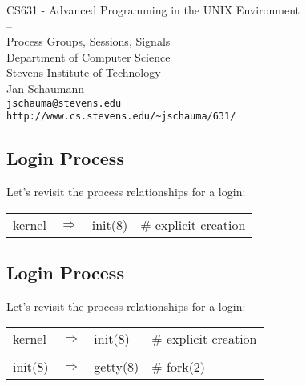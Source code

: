\documentclass[xga]{xdvislides}
\begin{document}
\setfontphv

\lhead{\slidetitle}
\cfoot{\relax}
\rfoot{\Gray{\today}}

\vspace*{\fill}
\begin{center}
	\Hugesize
		CS631 - Advanced Programming in the UNIX Environment\\
		-- \\
		Process Groups, Sessions, Signals
	\hspace*{5mm}\blueline\\ [1em]
	\Normalsize
		Department of Computer Science\\
		Stevens Institute of Technology\\
		Jan Schaumann\\
		\verb+jschauma@stevens.edu+\\
		\verb+http://www.cs.stevens.edu/~jschauma/631/+
\end{center}
\vspace*{\fill}
\subsection{Login Process}
Let's revisit the process relationships for a login:
\vspace*{\fill}
\begin{center}
\begin{tabular}[width=.75\texwidth]{l c l l}
kernel & $\Rightarrow$ & init(8) & \# explicit creation\\
\end{tabular}
\end{center}
\vspace*{\fill}

\subsection{Login Process}
Let's revisit the process relationships for a login:
\vspace*{\fill}
\begin{center}
\begin{tabular}[width=.75\texwidth]{l c l l}
kernel & $\Rightarrow$ & init(8) & \# explicit creation\\
\\
init(8) & $\Rightarrow$ & getty(8) & \# fork(2) \\
\end{tabular}
\end{center}
\vspace*{\fill}
\end{document}
